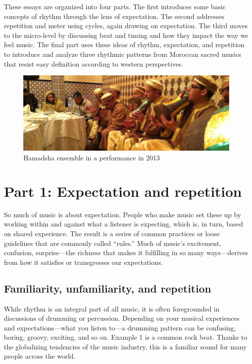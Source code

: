 \documentclass[twoside]{article}
\begin{document}
These essays are organized into four parts. The first introduces some
basic concepts of rhythm through the lens of expectation. The second
addresses repetition and meter using cycles, again drawing on
expectation. The third moves to the micro-level by discussing beat and
timing and how they impact the way we feel music. The final part uses
these ideas of rhythm, expectation, and repetition to introduce and
analyze three rhythmic patterns from Moroccan sacred musics that resist
easy definition according to western perspectives.

\begin{figure}
  \centering
  \includegraphics[width=\textwidth]{../../chapters/witulski-2021/images/Hamadsha2013.jpg}
  \caption*{Hamadsha ensemble in a performance in 2013}
\end{figure}  

\hypertarget{part-1-expectation-and-repetition}{%
\section*{Part 1: Expectation and
repetition}\label{part-1-expectation-and-repetition}}

So much of music is about expectation. People who make music set these
up by working within and against what a listener is expecting, which is,
in turn, based on shared experience. The result is a series of common
practices or loose guidelines that are commonly called ``rules.'' Much
of music's excitement, confusion, surprise---the richness that makes it
fulfilling in so many ways---derives from how it satisfies or
transgresses our expectations.

\hypertarget{familiarity-unfamiliarity-and-repetition}{%
\subsection*{Familiarity, unfamiliarity, and
repetition}\label{familiarity-unfamiliarity-and-repetition}}

While rhythm is an integral part of all music, it is often foregrounded
in discussions of drumming or percussion. Depending on your musical
experiences and expectations---what you listen to---a drumming pattern
can be confusing, boring, groovy, exciting, and so on. Example 1 is a common
rock beat. Thanks to the globalizing tendencies of the music industry,
this is a familiar sound for many people across the world.
\end{document}
